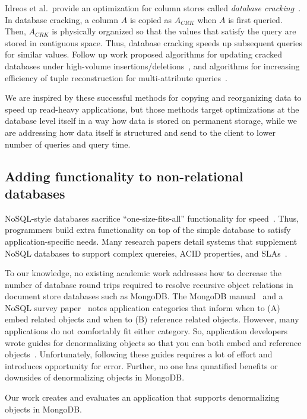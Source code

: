 Idreos et al.~provide an optimization for column stores called {\em database cracking}~\cite{Pirk2007}.
In database cracking, a column $A$ is copied as $A_{CRK}$ when $A$ is first queried.
Then, $A_{CRK}$ is physically organized so that the values that satisfy the query are stored in contiguous space.
Thus, database cracking speeds up subsequent queries for similar values.
Follow up work proposed algorithms for updating cracked databases under high-volume insertions/deletions~\cite{Idreos2007}, and algorithms for increasing efficiency of tuple reconstruction for multi-attribute queries~\cite{Idreos2009}.

We are inspired by these successful methods for copying and reorganizing data to speed up read-heavy applications, but those methods target optimizations at the database level itself in a way how data is stored on permanent storage, while we are addressing how data itself is structured and send to the client to lower number of queries and query time.

\subsection{Adding functionality to non-relational databases} 

NoSQL-style databases sacrifice ``one-size-fits-all'' functionality for speed~\cite{Strauch}.
Thus, programmers build extra functionality on top of the simple database to satisfy application-specific needs.
Many research papers detail systems that supplement NoSQL databases to support complex quereies, ACID properties, and SLAs~\cite{Decandia2007,Chang,Beaver2010,Baker}. 

To our knowledge, no existing academic work addresses how to decrease the number of database round trips required to resolve recursive object relations in document store databases such as MongoDB.
The MongoDB manual~\cite{MongoDB2014} and a NoSQL survey paper~\cite{Strauch} notes application categories that inform when to (A) embed related objects and when to (B) reference related objects.
However, many applications do not comfortably fit either category.
So, application developers wrote guides for denormalizing objects so that you can both embed and reference objects~\cite{Wanschik2010}.
Unfortunately, following these guides requires a lot of effort and introduces opportunity for error.
Further, no one has qunatified benefits or downsides of denormalizing objects in MongoDB.

Our work creates and evaluates an application that supports denormalizing objects in MongoDB.


